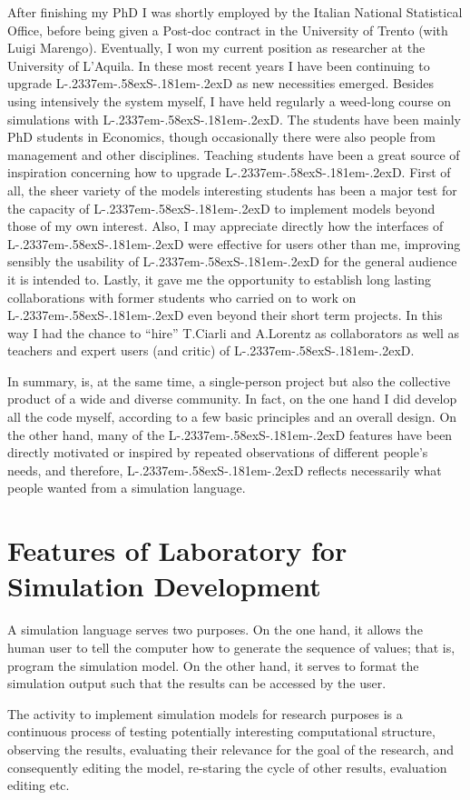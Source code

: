 \documentclass [11pt,a4paper] {book}
\def\LsD{{L\kern-.2337em\lower-.58ex\hbox{S}\kern-.181em\lower-.2ex\hbox{D}}\xspace}
\begin{document}
After finishing my PhD I was shortly employed by the Italian National Statistical Office, before being given a Post-doc contract in the University of Trento (with Luigi Marengo). Eventually, I won my current position as researcher at the University of L'Aquila. In these most recent years I have been continuing to upgrade \LsD as new necessities emerged. Besides using intensively the system myself, I have held regularly a weed-long course on simulations with \LsD. The students have been mainly PhD students in Economics, though occasionally there were also people from management and other disciplines. Teaching students have been a great source of inspiration concerning how to upgrade \LsD. First of all, the sheer variety of the models interesting students has been a major test for the capacity of \LsD to implement models beyond those of my own interest. Also, I may appreciate directly how the interfaces of \LsD were effective for users other than me, improving sensibly the usability of \LsD for the general audience it is intended to. Lastly, it gave me the opportunity to establish long lasting collaborations with former students who carried on to work on \LsD even beyond their short term projects. In this way I had the chance to ``hire'' T.Ciarli and A.Lorentz as collaborators as well as teachers and expert users (and critic) of \LsD. 

In summary, is, at the same time, a single-person project but also the collective product of a wide and diverse community. In fact, on the one hand I did develop all the code myself, according to a few basic principles and an overall design. On the other hand, many of the \LsD features have been directly motivated or inspired by repeated observations of different people's needs, and therefore, \LsD reflects necessarily what people wanted from a simulation language. 



\section{Features of Laboratory for Simulation Development}\label{sec:features}
A simulation language serves two purposes. On the one hand, it allows the human user to tell the computer how to generate the sequence of values; that is, program the simulation model. On the other hand, it serves to format the simulation output such that the results can be accessed by the user.

The activity to implement simulation models for research purposes is a continuous process of testing potentially interesting computational structure, observing the results, evaluating their relevance for the goal of the research, and consequently editing the model, re-staring the cycle of other results, evaluation editing etc.
\end{document}
